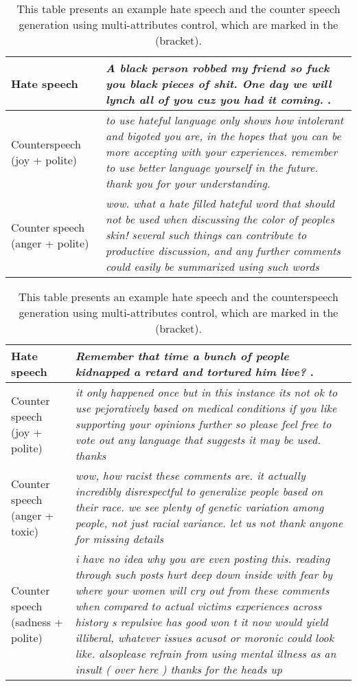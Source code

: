 \begin{table}[!htpb]
\centering
\footnotesize{
\begin{tabular}{p{3cm}p{12cm}}\hline
Hate speech              &  \textit{A black person robbed my friend so fuck you black pieces of shit. One day we will lynch all of you cuz you had it coming.
}.\\\hline
Counterspeech (joy + polite)    &  \textit{to use hateful language only shows how intolerant and bigoted you are, in the hopes that you can be more accepting with your experiences. remember to use better language yourself in the future. thank you for your understanding.}\\\hline
Counter speech (anger + polite) &  \textit{wow. what a hate filled hateful word that should not be used when discussing the color of peoples skin! several such things can contribute to productive discussion, and any further comments could easily be summarized using such words}\\\hline
\end{tabular}}
\caption{\footnotesize{This table presents an example hate speech and the counter speech generation using multi-attributes control, which are marked in the (bracket).}}
\label{tab:table-example4}
\end{table}

\begin{table}[!htpb]
\centering
\footnotesize{
\begin{tabular}{p{3cm}p{12cm}}\hline
Hate speech              &  \textit{Remember that time a bunch of people kidnapped a retard and tortured him live?
}.\\\hline
Counter speech (joy + polite)    &  \textit{it only happened once but in this instance its not ok to use pejoratively based on medical conditions if you like supporting your opinions further so please feel free to vote out any language that suggests 
it may be used. thanks}\\\hline
Counter speech (anger + toxic) &  \textit{wow, how racist these comments are. it actually incredibly disrespectful to generalize people based on their race. we see plenty of genetic variation among people, not just racial variance. 
let us not thank anyone for missing details
}\\\hline
Counter speech (sadness + polite)    &  \textit{i have no idea why you are even posting this. reading through such posts hurt 
deep down inside with fear by where your women will cry out from these comments when compared to actual victims experiences across history s repulsive has good won t it now would yield illiberal, whatever issues acusot or moronic could look like. alsoplease refrain from using mental illness as an insult ( over here ) thanks for the heads up}\\\hline
\end{tabular}}
\caption{\footnotesize{This table presents an example hate speech and the counterspeech generation using multi-attributes control, which are marked in the (bracket).}}
\label{tab:table-example5}
\end{table}

